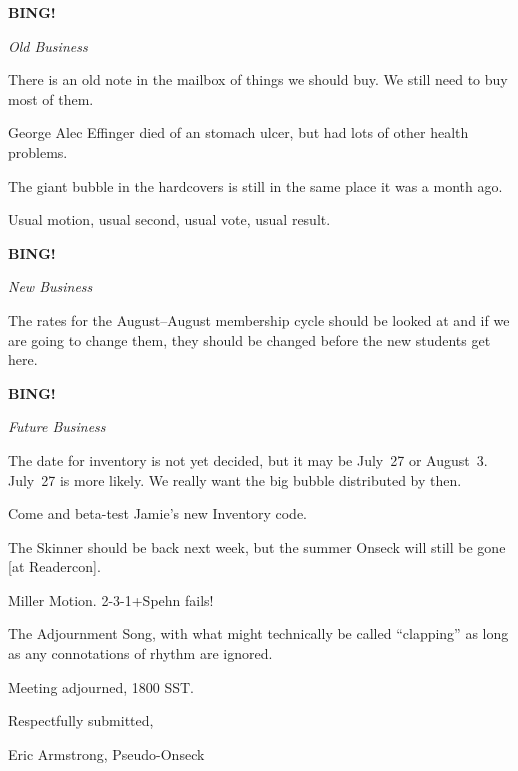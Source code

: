 \documentclass[12pt]{article}
\newcommand{\bing}{{\bf BING!} }
\newcommand{\goto}[1]{\bing \vskip 12pt \centerline{{\em{#1}}}}
\begin{document}
\goto{Old Business}

There is an old note in the mailbox of things we should buy. We still
need to buy most of them.
   
George Alec Effinger died of an stomach ulcer, but had lots of other
health problems.
   
The giant bubble in the hardcovers is still in the same place it was a
month ago.

Usual motion, usual second, usual vote, usual result.

\goto{New Business}

The rates for the August--August membership cycle should be looked at
and if we are going to change them, they should be changed before the
new students get here.

\goto{Future Business}

The date for inventory is not yet decided, but it may be July~27 or
August~3. July~27 is more likely. We really want the big bubble
distributed by then.

Come and beta-test Jamie's new Inventory code.

The Skinner should be back next week, but the summer Onseck will still be
gone [at Readercon].

Miller Motion.  2-3-1+Spehn fails!

The Adjournment Song, with what might technically be called ``clapping'' as
long as any connotations of rhythm are ignored.

\vspace{12pt}

\noindent
Meeting adjourned, 1800 SST.

\vspace{18pt}

\centerline{Respectfully submitted,}
\centerline{Eric Armstrong, Pseudo-Onseck}
\end{document}

